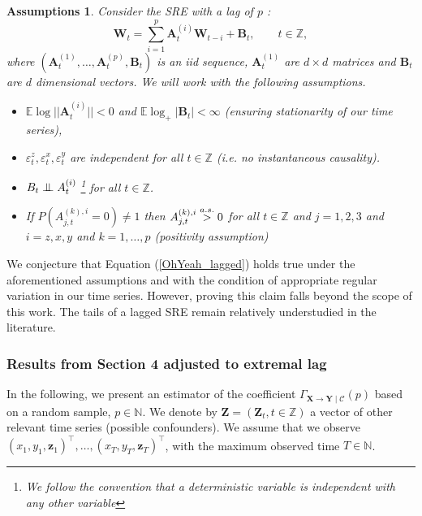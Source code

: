 \documentclass[a4paper,11pt]{article}
\newtheorem*{assumptions*}{Assumptions}
\newcommand{\indep}{\perp\kern-5.5pt\perp}
\newcommand{\toverset}[2]{\overset{{\rm #1}}{#2}}
\begin{document}
\begin{assumptions*}
Consider the SRE with a lag of $p$ \citep[Chapter 5]{SRE}:
\begin{equation*}\label{generalSRE_lagged}
    \textbf{W}_t = \sum_{i=1}^p\textbf{A}_{t}^{(i)}\textbf{W}_{t-i} +  \textbf{B}_t,\qquad t\in\mathbb{Z},
\end{equation*}
where $(\textbf{A}_t^{(1)},\dots, \textbf{A}_t^{(p)}, \textbf{B}_t)$ is an iid sequence, $\textbf{A}_t^{(1)}$ are $d\times d$ matrices and $\textbf{B}_t$ are $d$ dimensional vectors. We will work with the following assumptions.
\begin{itemize}
    \item[(A1.2)]  $\mathbb{E}\log||\textbf{A}_t^{(i)}|| < 0$ and $\mathbb{E}\log_+|\textbf{B}_t| < \infty$ (ensuring stationarity of our time series),
    \item[(A2.2)]  $\varepsilon_t^{z}, \varepsilon_t^{x}, \varepsilon_t^{y}$ are independent for all $t\in\mathbb{Z}$ (i.e. no instantaneous causality).
    \item[(A3.2)] $\textbf{B}_t\indep \textbf{A}_t^{(i)}$ \footnote{We follow the convention that a deterministic variable is independent with any other variable} for all $t\in\mathbb{Z}$.
    \item[(A5.2)] If $P(A_{j,t}^{(k),i}=0)\neq1$ then $A_{j,t}^{(k),i}\toverset{a.s.}{>}0$  for all  $t\in\mathbb{Z}$ and $j=1,2,3$ and  $i=z,x,y$ and $k = 1, \dots, p$ (positivity assumption)
\end{itemize}
\end{assumptions*} 

We conjecture that Equation (\ref{OhYeah_lagged}) holds true under the aforementioned assumptions and with the condition of appropriate regular variation in our time series. However, proving this claim falls beyond the scope of this work. The tails of a lagged SRE remain relatively understudied in the literature.

\subsubsection{Results from Section 4 adjusted to extremal lag}
\label{supplement_section4_lagged}
In the following, we present an estimator of the coefficient $\Gamma_{\textbf{X}\to\textbf{Y}\mid\mathcal{C}}(p)$ based on a random sample, $p\in\mathbb{N}$. We denote by  $\textbf{Z} = (\textbf{Z}_t, t\in\mathbb{Z})$ a vector of other relevant time series (possible confounders).  We assume that we observe $(x_1, y_1, \textbf{z}_1)^\top, \dots, (x_T, y_T, \textbf{z}_T)^\top$, with the maximum observed time $T\in\mathbb{N}$. 
\end{document}
